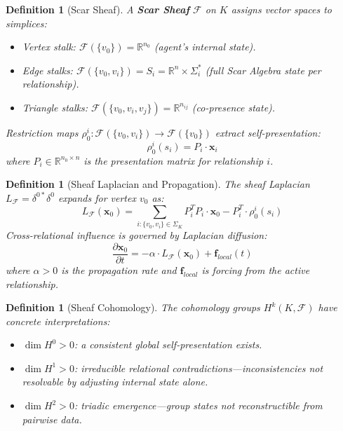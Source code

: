 \documentclass[11pt]{article}
\newtheorem{definition}[theorem]{Definition}
\begin{document}
\begin{definition}[Scar Sheaf]
A \textbf{Scar Sheaf} $\mathcal{F}$ on $K$ assigns vector spaces to simplices:
\begin{itemize}
\item Vertex stalk: $\mathcal{F}(\{v_0\}) = \mathbb{R}^{n_0}$ (agent's internal state).
\item Edge stalks: $\mathcal{F}(\{v_0, v_i\}) = S_i = \mathbb{R}^n \times \Sigma_i^*$ (full Scar Algebra state per relationship).
\item Triangle stalks: $\mathcal{F}(\{v_0, v_i, v_j\}) = \mathbb{R}^{n_{ij}}$ (co-presence state).
\end{itemize}
Restriction maps $\rho_0^i: \mathcal{F}(\{v_0, v_i\}) \to \mathcal{F}(\{v_0\})$ extract self-presentation:
\begin{equation}
\rho_0^i(s_i) = P_i \cdot \mathbf{x}_i
\end{equation}
where $P_i \in \mathbb{R}^{n_0 \times n}$ is the presentation matrix for relationship $i$.
\end{definition}

\begin{definition}[Sheaf Laplacian and Propagation]
The sheaf Laplacian $L_\mathcal{F} = \delta^{0*}\delta^0$ expands for vertex $v_0$ as:
\begin{equation}
L_\mathcal{F}(\mathbf{x}_0) = \sum_{i: \{v_0, v_i\} \in \Sigma_K} P_i^T P_i \cdot \mathbf{x}_0 - P_i^T \cdot \rho_0^i(s_i)
\end{equation}
Cross-relational influence is governed by Laplacian diffusion:
\begin{equation}
\frac{\partial \mathbf{x}_0}{\partial t} = -\alpha \cdot L_\mathcal{F}(\mathbf{x}_0) + \mathbf{f}_{local}(t)
\end{equation}
where $\alpha > 0$ is the propagation rate and $\mathbf{f}_{local}$ is forcing from the active relationship.
\end{definition}

\begin{definition}[Sheaf Cohomology]
The cohomology groups $H^k(K, \mathcal{F})$ have concrete interpretations:
\begin{itemize}
\item $\dim H^0 > 0$: a consistent global self-presentation exists.
\item $\dim H^1 > 0$: irreducible relational contradictions---inconsistencies not resolvable by adjusting internal state alone.
\item $\dim H^2 > 0$: triadic emergence---group states not reconstructible from pairwise data.
\end{itemize}
\end{definition}
\end{document}

